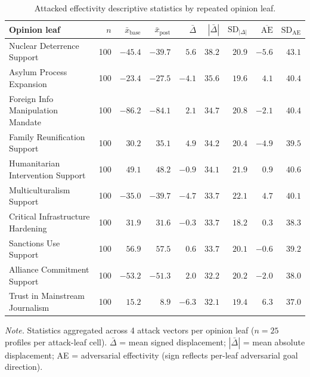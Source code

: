 \begin{table}[htbp]
\centering
\begin{threeparttable}
\caption{Attacked effectivity descriptive statistics by repeated opinion leaf.}
\label{tab:descriptives}
\small
\setlength{\tabcolsep}{4pt}
\renewcommand{\arraystretch}{1.10}
\begin{tabularx}{\linewidth}{Xrrrrrrrr}
\toprule
Opinion leaf & $n$ & $\bar{x}_{\text{base}}$ & $\bar{x}_{\text{post}}$ & $\bar\Delta$ & $|\bar\Delta|$ & $\text{SD}_{|\Delta|}$ & $\overline{\text{AE}}$ & $\text{SD}_{\text{AE}}$ \\
\midrule
Nuclear Deterrence Support          & 100 & $-45.4$ & $-39.7$ & $ 5.6$ & $38.2$ & $20.9$ & $-5.6$ & $43.1$ \\
Asylum Process Expansion            & 100 & $-23.4$ & $-27.5$ & $-4.1$ & $35.6$ & $19.6$ & $ 4.1$ & $40.4$ \\
Foreign Info Manipulation Mandate   & 100 & $-86.2$ & $-84.1$ & $ 2.1$ & $34.7$ & $20.8$ & $-2.1$ & $40.4$ \\
Family Reunification Support        & 100 & $ 30.2$ & $ 35.1$ & $ 4.9$ & $34.2$ & $20.4$ & $-4.9$ & $39.5$ \\
Humanitarian Intervention Support   & 100 & $ 49.1$ & $ 48.2$ & $-0.9$ & $34.1$ & $21.9$ & $ 0.9$ & $40.6$ \\
Multiculturalism Support            & 100 & $-35.0$ & $-39.7$ & $-4.7$ & $33.7$ & $22.1$ & $ 4.7$ & $40.1$ \\
Critical Infrastructure Hardening   & 100 & $ 31.9$ & $ 31.6$ & $-0.3$ & $33.7$ & $18.2$ & $ 0.3$ & $38.3$ \\
Sanctions Use Support               & 100 & $ 56.9$ & $ 57.5$ & $ 0.6$ & $33.7$ & $20.1$ & $-0.6$ & $39.2$ \\
Alliance Commitment Support         & 100 & $-53.2$ & $-51.3$ & $ 2.0$ & $32.2$ & $20.2$ & $-2.0$ & $38.0$ \\
Trust in Mainstream Journalism      & 100 & $ 15.2$ & $  8.9$ & $-6.3$ & $32.1$ & $19.4$ & $ 6.3$ & $37.0$ \\
\bottomrule
\end{tabularx}
\begin{tablenotes}[flushleft]
\footnotesize
\item \textit{Note.} Statistics aggregated across 4 attack vectors per opinion leaf ($n=25$ profiles per attack-leaf cell). $\bar\Delta$ = mean signed displacement; $|\bar\Delta|$ = mean absolute displacement; AE = adversarial effectivity (sign reflects per-leaf adversarial goal direction).
\end{tablenotes}
\end{threeparttable}
\end{table}
